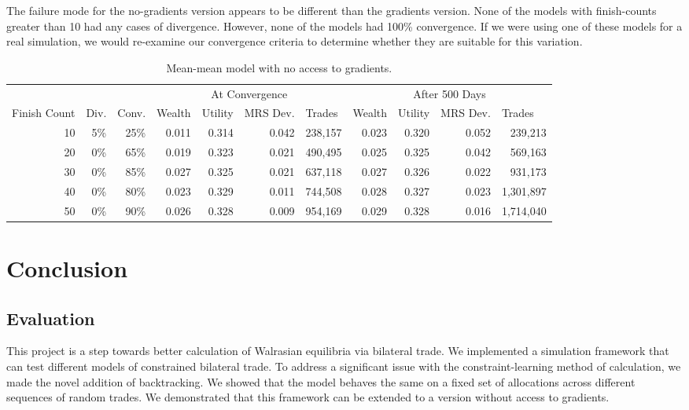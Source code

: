 \documentclass[12pt,a4paper,titlepage]{article}
\begin{document}
The failure mode for the no-gradients version appears to be different than the gradients version.
None of the models with finish-counts greater than 10 had any cases of divergence.
However, none of the models had 100\% convergence.
If we were using one of these models for a real simulation, we would re-examine our convergence criteria to determine whether they are suitable for this variation.

\begin{table}
  \begin{tabular}{r|rr|rrrr|rrrr}
    
    & \multicolumn{1}{|l}{} & \multicolumn{1}{l}{} & \multicolumn{ 4}{|c|}{At Convergence} & \multicolumn{ 4}{c}{After 500 Days} \\ 
    Finish Count & \multicolumn{1}{|l}{Div.} & \multicolumn{1}{l}{Conv.} & \multicolumn{1}{|l}{Wealth} & \multicolumn{1}{l}{Utility} & \multicolumn{1}{l}{MRS Dev.} & \multicolumn{1}{l}{Trades} & \multicolumn{1}{|l}{Wealth} & \multicolumn{1}{l}{Utility} & \multicolumn{1}{l}{MRS Dev.} & \multicolumn{1}{l}{Trades} \\ 
    \hline
    10 & 5\% & 25\% & 0.011 & 0.314 & 0.042 & 238,157 & 0.023 & 0.320 & 0.052 & 239,213 \\ 
    20 & 0\% & 65\% & 0.019 & 0.323 & 0.021 & 490,495 & 0.025 & 0.325 & 0.042 & 569,163 \\ 
    30 & 0\% & 85\% & 0.027 & 0.325 & 0.021 & 637,118 & 0.027 & 0.326 & 0.022 & 931,173 \\ 
    40 & 0\% & 80\% & 0.023 & 0.329 & 0.011 & 744,508 & 0.028 & 0.327 & 0.023 & 1,301,897 \\ 
    50 & 0\% & 90\% & 0.026 & 0.328 & 0.009 & 954,169 & 0.029 & 0.328 & 0.016 & 1,714,040 \\ 
  \end{tabular}
  \caption{Mean-mean model with no access to gradients.}
  \label{tab:ut}
\end{table}

\section{Conclusion}\label{conclusion}

\subsection{Evaluation}
This project is a step towards better calculation of Walrasian equilibria via bilateral trade.
We implemented a simulation framework that can test different models of constrained bilateral trade.
To address a significant issue with the constraint-learning method of calculation, we made the novel addition of backtracking.
We showed that the model behaves the same on a fixed set of allocations across different sequences of random trades.
We demonstrated that this framework can be extended to a version without access to gradients.
\end{document}
